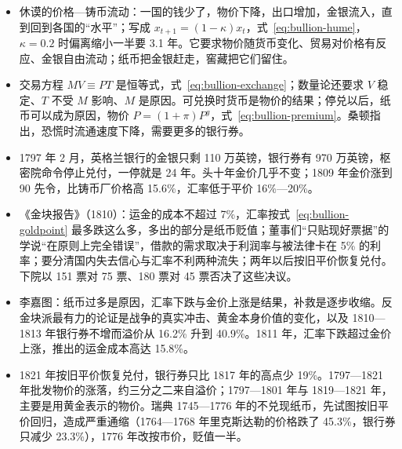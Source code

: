 \begin{takeaways}
\begin{itemize}
\item 休谟的价格—铸币流动：一国的钱少了，物价下降，出口增加，金银流入，直到回到各国的“水平”；写成 $x_{t+1}=(1-\kappa)x_{t}$，式~\eqref{eq:bullion-hume}，$\kappa=0.2$ 时偏离缩小一半要 3.1 年。它要求物价随货币变化、贸易对价格有反应、金银自由流动；纸币把金银赶走，窖藏把它们留住。
\item 交易方程 $MV\equiv PT$ 是恒等式，式~\eqref{eq:bullion-exchange}；数量论还要求 $V$ 稳定、$T$ 不受 $M$ 影响、$M$ 是原因。可兑换时货币是物价的结果；停兑以后，纸币可以成为原因，物价 $P=(1+\pi)P^{g}$，式~\eqref{eq:bullion-premium}。桑顿指出，恐慌时流通速度下降，需要更多的银行券。
\item 1797 年 2 月，英格兰银行的金银只剩 110 万英镑，银行券有 970 万英镑，枢密院命令停止兑付，一停就是 24 年。头十年金价几乎不变；1809 年金价涨到 90 先令，比铸币厂价格高 15.6\%，汇率低于平价 16\%—20\%。
\item 《金块报告》（1810）：运金的成本不超过 7\%，汇率按式~\eqref{eq:bullion-goldpoint} 最多跌这么多，多出的部分是纸币贬值；董事们“只贴现好票据”的学说“在原则上完全错误”，借款的需求取决于利润率与被法律卡在 5\% 的利率；要分清国内失去信心与汇率不利两种流失；两年以后按旧平价恢复兑付。下院以 151 票对 75 票、180 票对 45 票否决了这些决议。
\item 李嘉图：纸币过多是原因，汇率下跌与金价上涨是结果，补救是逐步收缩。反金块派最有力的论证是战争的真实冲击、黄金本身价值的变化，以及 1810—1813 年银行券不增而溢价从 16.2\% 升到 40.9\%。1811 年，汇率下跌超过金价上涨，推出的运金成本高达 15.8\%。
\item 1821 年按旧平价恢复兑付，银行券只比 1817 年的高点少 19\%。1797—1821 年批发物价的涨落，约三分之二来自溢价；1797—1801 年与 1819—1821 年，主要是用黄金表示的物价。瑞典 1745—1776 年的不兑现纸币，先试图按旧平价回归，造成严重通缩（1764—1768 年里克斯达勒的价格跌了 45.3\%，银行券只减少 23.3\%），1776 年改按市价，贬值一半。
\end{itemize}
\end{takeaways}

